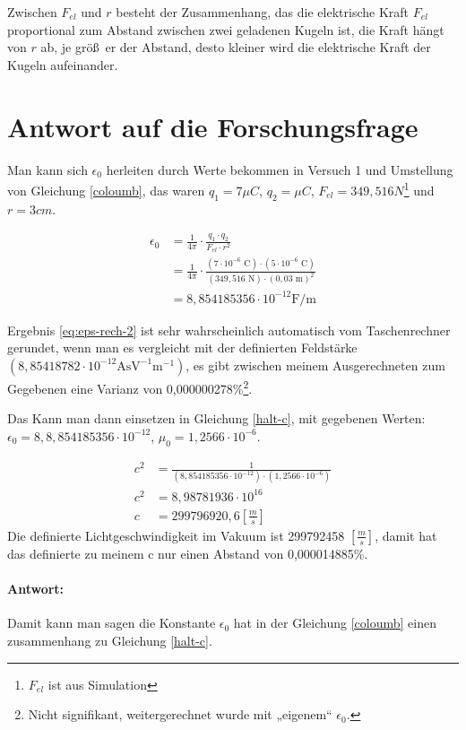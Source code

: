 \documentclass[a4paper]{article}
\begin{document}
Zwischen $F_{el}$ und $r$ besteht der Zusammenhang, das die elektrische Kraft
$F_{el}$ proportional zum Abstand zwischen zwei geladenen Kugeln ist, die Kraft
h\"angt von $r$ ab, je gr\"o\ss~er der Abstand, desto kleiner wird die
elektrische Kraft der Kugeln aufeinander.



\section{Antwort auf die Forschungsfrage} %
\label{ssub:Messergebnisse und ggf. grafische Veranschaulichung}
Man kann sich $\epsilon_0$ herleiten durch Werte bekommen in Versuch 1 und
Umstellung von Gleichung \ref{coloumb}, das
waren $q_1=7\mu C$, $q_2=\mu C$, $F_{el}=349,516N$\footnote{$F_{el}$ ist aus Simulation} und $r=3cm$.

\begin{align}
\epsilon_0 &= \frac{1}{4\pi} \cdot \frac{q_1 \cdot q_2}{F_{el} \cdot r^2} \\
&= \frac{1}{4\pi} \cdot \frac{(7\cdot 10^{-6}\text{ C}) \cdot (5\cdot
10^{-6}\text{ C})}{(349,516\text{ N}) \cdot (0,03\text{ m})^2} \\
&= 8,854185356\cdot 10^{-12}\text{F/m} \label{eq:eps-rech-2}
\end{align}

Ergebnis \ref{eq:eps-rech-2} ist sehr wahrscheinlich automatisch vom Taschenrechner gerundet,
wenn man es vergleicht mit der definierten Feldstärke $(8,85418782\cdot
10^{-12}\text{AsV}^{-1}\text{m}^{-1})$, es gibt zwischen meinem
Ausgerechneten zum Gegebenen eine Varianz von 0,000000278\%\footnote{Nicht
signifikant, weitergerechnet wurde mit  „eigenem“ $\epsilon_0$.}.

Das Kann man dann einsetzen in Gleichung \ref{halt-c}, mit gegebenen Werten:
$\epsilon_0 = 8,8,854185356 \cdot 10^{-12}$, $\mu_0=1,2566\cdot 10^{-6}$.

\begin{align}
  c^2 &= \frac{1}{(8,854185356 \cdot 10^{-12})\cdot (1,2566\cdot 10^{-6})}\\
  c^2 &= 8,98781936\cdot 10^{16}\\
  c   &= 299796920,6 \left[\frac{m}{s}\right]
\end{align}
Die definierte Lichtgeschwindigkeit im Vakuum ist 299792458
$\left[\frac{m}{s}\right]$, damit hat das definierte zu meinem c nur einen
Abstand von 0,000014885\%.

\paragraph{Antwort:}
Damit kann man sagen die Konstante $\epsilon_0$ hat in der Gleichung
\ref{coloumb} einen zusammenhang zu Gleichung \ref{halt-c}.
\end{document}
